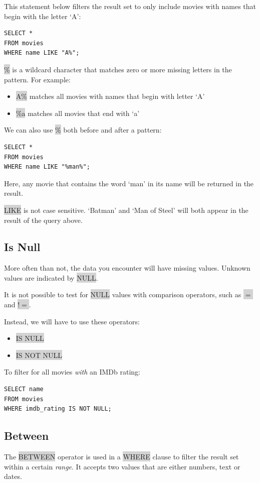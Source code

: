 \documentclass[11pt]{article}
\begin{document}
{{This statement below filters the result set to only include movies with names that begin with the letter ‘A’:
\begin{lstlisting}
SELECT * 
FROM movies
WHERE name LIKE "A%";
\end{lstlisting}
\colorbox{lightgray}{\%} is a wildcard character that matches zero or more missing letters in the pattern. For example:
\begin{itemize}[leftmargin = *]
\item \colorbox{lightgray}{A\%} matches all movies with names that begin with letter ‘A’
\item \colorbox{lightgray}{\%a} matches all movies that end with ‘a’
\end{itemize}
We can also use \colorbox{lightgray}{\%} both before and after a pattern:
\begin{lstlisting}
SELECT * 
FROM movies 
WHERE name LIKE "%man%";
\end{lstlisting}
Here, any movie that contains the word ‘man’ in its name will be returned in the result.

\colorbox{lightgray}{LIKE} is not case sensitive. ‘Batman’ and ‘Man of Steel’ will both appear in the result of the query above.

\subsection{Is Null}
More often than not, the data you encounter will have missing values. Unknown values are indicated by \colorbox{lightgray}{NULL}.

It is not possible to test for \colorbox{lightgray}{NULL} values with comparison operators, such as \colorbox{lightgray}{$=$} and \colorbox{lightgray}{$!$$=$}.

Instead, we will have to use these operators:
\begin{itemize}[leftmargin = *]
\item \colorbox{lightgray}{IS NULL}
\item \colorbox{lightgray}{IS NOT NULL}
\end{itemize}
To filter for all movies \textit{with} an IMDb rating:
\begin{lstlisting}
SELECT name
FROM movies 
WHERE imdb_rating IS NOT NULL;
\end{lstlisting}

\subsection{Between}
The \colorbox{lightgray}{BETWEEN} operator is used in a \colorbox{lightgray}{WHERE} clause to filter the result set within a certain \textit{range}. It accepts two values that are either numbers, text or dates.

}}
\end{document}
